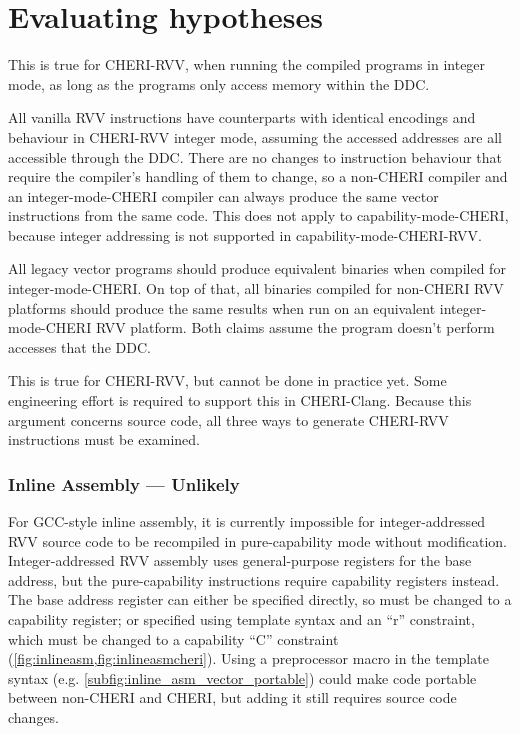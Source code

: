 \section{Evaluating hypotheses}\label{chap:software:sec:hypotheses}

This is true for CHERI-RVV, when running the compiled programs in integer mode, as long as the programs only access memory within the DDC.

All vanilla RVV instructions have counterparts with identical encodings and behaviour in CHERI-RVV integer mode, assuming the accessed addresses are all accessible through the DDC.
There are no changes to instruction behaviour that require the compiler's handling of them to change, so a non-CHERI compiler and an integer-mode-CHERI compiler can always produce the same vector instructions from the same code.
This does not apply to capability-mode-CHERI, because integer addressing is not supported in capability-mode-CHERI-RVV.

All legacy vector programs should produce equivalent binaries when compiled for integer-mode-CHERI.
On top of that, all binaries compiled for non-CHERI RVV platforms should produce the same results when run on an equivalent integer-mode-CHERI RVV platform.
Both claims assume the program doesn't perform accesses that  the DDC.

This is true for CHERI-RVV, but cannot be done in practice yet.
Some engineering effort is required to support this in CHERI-Clang.
Because this argument concerns source code, all three ways to generate CHERI-RVV instructions must be examined.

\subsubsection*{Inline Assembly --- Unlikely}
For GCC-style inline assembly, it is currently impossible for integer-addressed RVV source code to be recompiled in pure-capability mode without modification.
Integer-addressed RVV assembly uses general-purpose registers for the base address, but the pure-capability instructions require capability registers instead.
The base address register can either be specified directly, so must be changed to a capability register; or specified using template syntax and an ``r'' constraint, which must be changed to a capability ``C'' constraint (\cref{fig:inlineasm,fig:inlineasmcheri}).
Using a preprocessor macro in the template syntax (e.g. \cref{subfig:inline_asm_vector_portable}) could make code portable between non-CHERI and CHERI, but adding it still requires source code changes.

